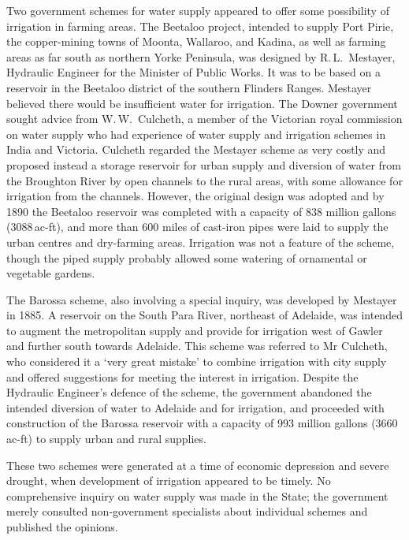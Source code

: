 Two government schemes for water supply appeared to offer some
possibility of irrigation in farming areas.  The Beetaloo project,
intended to supply Port Pirie, the copper-mining towns of Moonta,
Wallaroo, and Kadina, as well as farming areas as far south as
northern Yorke Peninsula, was designed by R.\,L.~Mestayer, Hydraulic
Engineer for the Minister of Public Works.  It was to be based on a
reservoir in the Beetaloo district of the southern Flinders Ranges.
Mestayer believed there would be insufficient water for irrigation.
The Downer government sought advice from W.\,W.~Culcheth, a member of
the Victorian royal commission on water supply who had experience of
water supply and irrigation schemes in India and Victoria.  Culcheth
regarded the Mestayer scheme as very costly and proposed instead a
storage reservoir for urban supply and diversion of water from the
Broughton River by open channels to the rural areas, with some
allowance for irrigation from the channels.  However, the original
design was adopted and by 1890 the Beetaloo reservoir was completed
with a capacity of 838 million gallons (3088\,ac-ft), and more than
600 miles of cast-iron pipes were laid to supply the urban centres and
dry-farming areas.  Irrigation was not a feature of the scheme, though
the piped supply probably allowed some watering of ornamental or
vegetable gardens.

The Barossa scheme, also involving a special inquiry, was developed by
Mestayer in 1885.  A reservoir on the South Para River, northeast of
Adelaide, was intended to augment the metropolitan supply and provide
for irrigation west of Gawler and further south towards Adelaide.
This scheme was referred to Mr Culcheth, who considered it a `very
great mistake' to combine irrigation with city supply and offered
suggestions for meeting the interest in irrigation.  Despite the
Hydraulic Engineer's defence of the scheme, the government abandoned
the intended diversion of water to Adelaide and for irrigation, and
proceeded with construction of the Barossa reservoir with a capacity
of 993 million gallons (3660\,ac-ft) to supply urban and rural
supplies.

These two schemes were generated at a time of economic depression and
severe drought, when development of irrigation appeared to be
timely. No comprehensive inquiry on water supply was made in the
State; the government merely consulted non-government specialists
about individual schemes and published the opinions.

